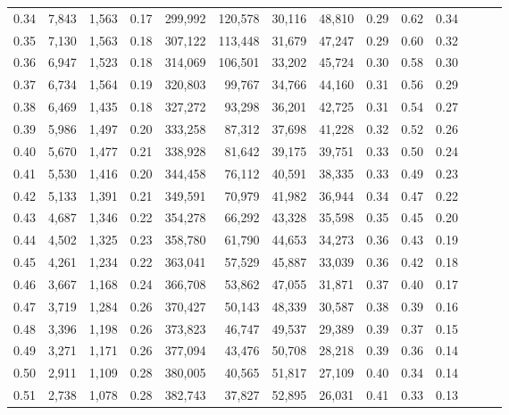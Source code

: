 \begin{tabular}{rrrrrrrrrrrrrr}
0.34 &   7,843 &  1,563 &  0.17 &  299,992 &  120,578 &  30,116 &  48,810 &  0.29 &  0.62 &      0.34 \\
0.35 &   7,130 &  1,563 &  0.18 &  307,122 &  113,448 &  31,679 &  47,247 &  0.29 &  0.60 &      0.32 \\
0.36 &   6,947 &  1,523 &  0.18 &  314,069 &  106,501 &  33,202 &  45,724 &  0.30 &  0.58 &      0.30 \\
0.37 &   6,734 &  1,564 &  0.19 &  320,803 &   99,767 &  34,766 &  44,160 &  0.31 &  0.56 &      0.29 \\
0.38 &   6,469 &  1,435 &  0.18 &  327,272 &   93,298 &  36,201 &  42,725 &  0.31 &  0.54 &      0.27 \\
0.39 &   5,986 &  1,497 &  0.20 &  333,258 &   87,312 &  37,698 &  41,228 &  0.32 &  0.52 &      0.26 \\
0.40 &   5,670 &  1,477 &  0.21 &  338,928 &   81,642 &  39,175 &  39,751 &  0.33 &  0.50 &      0.24 \\
0.41 &   5,530 &  1,416 &  0.20 &  344,458 &   76,112 &  40,591 &  38,335 &  0.33 &  0.49 &      0.23 \\
0.42 &   5,133 &  1,391 &  0.21 &  349,591 &   70,979 &  41,982 &  36,944 &  0.34 &  0.47 &      0.22 \\
0.43 &   4,687 &  1,346 &  0.22 &  354,278 &   66,292 &  43,328 &  35,598 &  0.35 &  0.45 &      0.20 \\
0.44 &   4,502 &  1,325 &  0.23 &  358,780 &   61,790 &  44,653 &  34,273 &  0.36 &  0.43 &      0.19 \\
0.45 &   4,261 &  1,234 &  0.22 &  363,041 &   57,529 &  45,887 &  33,039 &  0.36 &  0.42 &      0.18 \\
0.46 &   3,667 &  1,168 &  0.24 &  366,708 &   53,862 &  47,055 &  31,871 &  0.37 &  0.40 &      0.17 \\
0.47 &   3,719 &  1,284 &  0.26 &  370,427 &   50,143 &  48,339 &  30,587 &  0.38 &  0.39 &      0.16 \\
0.48 &   3,396 &  1,198 &  0.26 &  373,823 &   46,747 &  49,537 &  29,389 &  0.39 &  0.37 &      0.15 \\
0.49 &   3,271 &  1,171 &  0.26 &  377,094 &   43,476 &  50,708 &  28,218 &  0.39 &  0.36 &      0.14 \\
0.50 &   2,911 &  1,109 &  0.28 &  380,005 &   40,565 &  51,817 &  27,109 &  0.40 &  0.34 &      0.14 \\
0.51 &   2,738 &  1,078 &  0.28 &  382,743 &   37,827 &  52,895 &  26,031 &  0.41 &  0.33 &      0.13 \\

\end{tabular}
